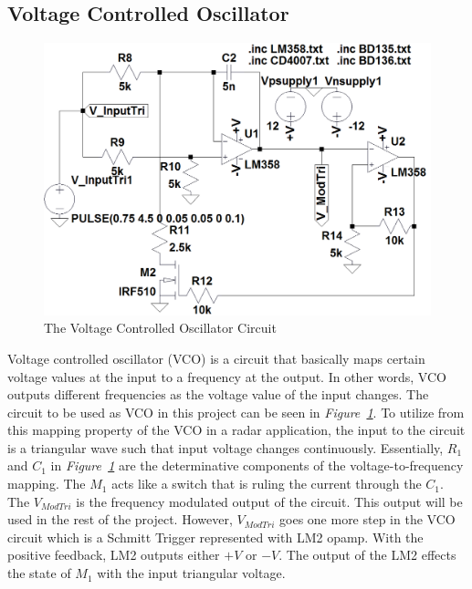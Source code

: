 \documentclass[paper]{IEEEtran}
\begin{document}
\subsection{Voltage Controlled Oscillator}
\begin{figure}[h!]
 \setlength{\unitlength}{\textwidth}
 \center 
 \includegraphics[width=0.45\unitlength]{VCO_Circuit}
 \caption{\label{fig:VCO_Circuit}The Voltage Controlled Oscillator Circuit}
\end{figure}

Voltage controlled oscillator (VCO) is a circuit that basically maps certain voltage values at the input to a frequency at the output. In other words, VCO outputs different frequencies as the voltage value of the input changes. The circuit to be used as VCO in this project can be seen in \textit{Figure~\ref{fig:VCO_Circuit}}. To utilize from this mapping property of the VCO in a radar application, the input to the circuit is a triangular wave such that input voltage changes continuously. Essentially, $R_{1}$ and $C_{1}$ in \textit{Figure~\ref{fig:VCO_Circuit}} are the determinative components of the voltage-to-frequency mapping. The $M_{1}$ acts like a switch that is ruling the current through the $C_{1}$. The $V_{ModTri}$ is the frequency modulated output of the circuit. This output will be used in the rest of the project. However, $V_{ModTri}$ goes one more step in the VCO circuit which is a Schmitt Trigger represented with LM2 opamp. With the positive feedback, LM2 outputs either $+V$ or $-V$. The output of the LM2 effects the state of $M_{1}$ with the input triangular voltage.
\end{document}
